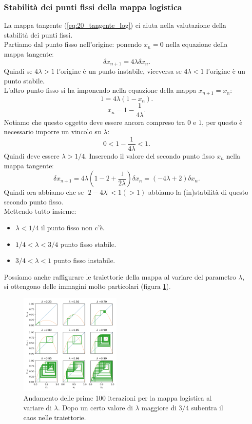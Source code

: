 \subsubsection{Stabilità dei punti fissi della mappa logistica}%
\label{subsub:Stabilità dei punti fissi della mappa logistica}
La mappa tangente (\ref{eq:20_tangente_log}) ci aiuta nella valutazione della stabilità dei punti fissi.\\
Partiamo dal punto fisso nell'origine: ponendo $x_n = 0$ nella equazione della mappa tangente:
\[
    \delta x_{n+1} = 4\lambda\delta x_n
.\] 
Quindi se $4\lambda > 1$ l'origine è un punto instabile, viceversa se $4\lambda <1$ l'origine è un punto stabile.\\
L'altro punto fisso si ha imponendo nella equazione della mappa $x_{n+1}=x_n$:
\[
    1 = 4\lambda (1-x_n)
.\] 
\[
    x_n = 1 - \frac{1}{4\lambda}
.\] 
Notiamo che questo oggetto deve essere ancora compreso tra $0$ e $1$, per questo è necessario imporre un vincolo su $\lambda$:
\[
    0 < 1-\frac{1}{4\lambda}<1
.\] 
Quindi deve essere $\lambda >1 /4$.
Inserendo il valore del secondo punto fisso $x_n$ nella mappa tangente:
\[
    \delta x_{n+1}= 4\lambda (1 -2 + \frac{1}{2\lambda})\delta x_n = (-4\lambda  + 2)\delta x_n
.\] 
Quindi ora abbiamo che se $\left|2 - 4\lambda\right| < 1 (> 1)$ abbiamo la (in)stabilità di questo secondo punto fisso.\\
Mettendo tutto insieme:
\begin{itemize}
    \item $\lambda<1 /4$ il punto fisso non c'è.
    \item $1 /4 <\lambda  < 3 /4$ punto fisso stabile.
    \item $3 /4 <\lambda <1$ punto fisso instabile.
\end{itemize}
Possiamo anche raffigurare le traiettorie della mappa al variare del parametro $\lambda$, si ottengono delle immagini molto particolari (figura \ref{fig:figures-20_mappa_logistica_lambda-png}).
\begin{figure}[h]
    \centering
    \includegraphics[width=0.45\textwidth]{figures/20_mappa_logistica_lambda.png}
    \caption{\scriptsize Andamento delle prime 100 iterazioni per la mappa logistica al variare di $\lambda$. Dopo un certo valore di $\lambda$ maggiore di $3 /4$ subentra il caos nelle traiettorie.}
    \label{fig:figures-20_mappa_logistica_lambda-png}
\end{figure}
